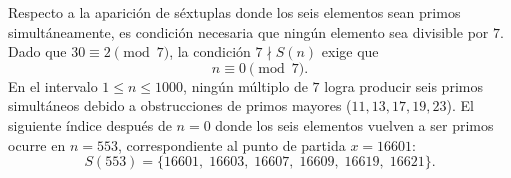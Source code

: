 \documentclass[11pt, a4paper]{article}
\begin{document}
Respecto a la aparición de séxtuplas donde los seis elementos sean primos simultáneamente, es condición necesaria que ningún elemento sea divisible por $7$. Dado que $30 \equiv 2 \pmod 7$, la condición $7 \nmid S(n)$ exige que
\[
n \equiv 0 \pmod 7.
\]
En el intervalo $1 \le n \le 1000$, ningún múltiplo de $7$ logra producir seis primos simultáneos debido a obstrucciones de primos mayores ($11, 13, 17, 19, 23$). El siguiente índice después de $n = 0$ donde los seis elementos vuelven a ser primos ocurre en $n = 553$, correspondiente al punto de partida $x = 16601$:
\[
S(553) = \{16601,\; 16603,\; 16607,\; 16609,\; 16619,\; 16621\}.
\]
\end{document}
